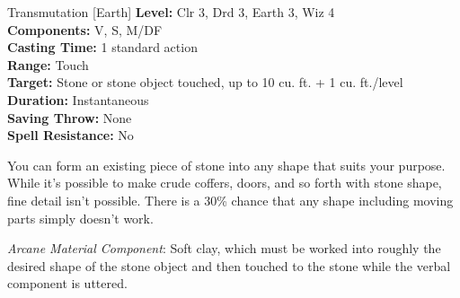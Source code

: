 {Transmutation [Earth]}
{
	\textbf{Level:}
	Clr 3, Drd 3, Earth 3, Wiz 4\\
	\textbf{Components:}
	V, S, M/DF\\
	\textbf{Casting Time:}
	1 standard action\\
	\textbf{Range:}
	Touch\\
	\textbf{Target:}
	Stone or stone object touched, up to 10 cu. ft. + 1 cu. ft./level\\
	\textbf{Duration:}
	Instantaneous\\
	\textbf{Saving Throw:}
	None\\
	\textbf{Spell Resistance:}
	No\\
}
{
	You can form an existing piece of stone into any shape that suits your purpose. While it's possible to make crude coffers, doors, and so forth with stone shape, fine detail isn't possible. There is a 30\% chance that any shape including moving parts simply doesn't work.

	\textit{Arcane Material Component}:
	Soft clay, which must be worked into roughly the desired shape of the stone object and then touched to the stone while the verbal component is uttered.

}
